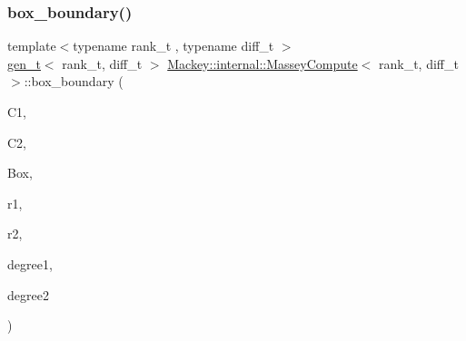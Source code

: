 \subsubsection{\texorpdfstring{box\+\_\+boundary()}{box\_boundary()}}
{\footnotesize\ttfamily template$<$typename rank\+\_\+t , typename diff\+\_\+t $>$ \\
\hyperlink{namespaceMackey_a6bb0b2796632ba6c7f8ea192f7aecffe}{gen\+\_\+t}$<$ rank\+\_\+t, diff\+\_\+t $>$ \hyperlink{structMackey_1_1internal_1_1MasseyCompute}{Mackey\+::internal\+::\+Massey\+Compute}$<$ rank\+\_\+t, diff\+\_\+t $>$\+::box\+\_\+boundary (\begin{DoxyParamCaption}\item[{const \hyperlink{classMackey_1_1Chains}{Chains}$<$ rank\+\_\+t, diff\+\_\+t $>$ \&}]{C1,  }\item[{const \hyperlink{classMackey_1_1Chains}{Chains}$<$ rank\+\_\+t, diff\+\_\+t $>$ \&}]{C2,  }\item[{const \hyperlink{classMackey_1_1ChainsBox}{Chains\+Box}$<$ rank\+\_\+t, diff\+\_\+t $>$ \&}]{Box,  }\item[{const \hyperlink{namespaceMackey_a6bb0b2796632ba6c7f8ea192f7aecffe}{gen\+\_\+t}$<$ rank\+\_\+t, diff\+\_\+t $>$ \&}]{r1,  }\item[{const \hyperlink{namespaceMackey_a6bb0b2796632ba6c7f8ea192f7aecffe}{gen\+\_\+t}$<$ rank\+\_\+t, diff\+\_\+t $>$ \&}]{r2,  }\item[{int}]{degree1,  }\item[{int}]{degree2 }\end{DoxyParamCaption})}

